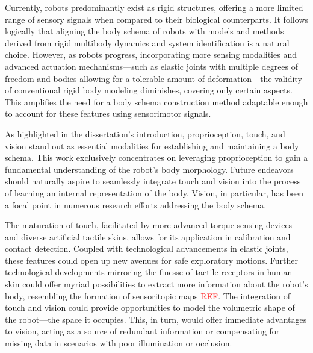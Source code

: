 \documentclass[12pt, a4paper]{article}
\newcommand{\redtext}[1]{\textcolor{red}{#1}}
\begin{document}
Currently, robots predominantly exist as rigid structures, offering a more limited range of sensory signals when compared to their biological counterparts. It follows logically that aligning the body schema of robots with models and methods derived from rigid multibody dynamics and system identification is a natural choice. However, as robots progress, incorporating more sensing modalities and advanced actuation mechanisms—such as elastic joints with multiple degrees of freedom and bodies allowing for a tolerable amount of deformation—the validity of conventional rigid body modeling diminishes, covering only certain aspects. This amplifies the need for a body schema construction method adaptable enough to account for these features using sensorimotor signals.

As highlighted in the dissertation's introduction, proprioception, touch, and vision stand out as essential modalities for establishing and maintaining a body schema. This work exclusively concentrates on leveraging proprioception to gain a fundamental understanding of the robot's body morphology. Future endeavors should naturally aspire to seamlessly integrate touch and vision into the process of learning an internal representation of the body. Vision, in particular, has been a focal point in numerous research efforts addressing the body schema.

The maturation of touch, facilitated by more advanced torque sensing devices and diverse artificial tactile skins, allows for its application in calibration and contact detection. Coupled with technological advancements in elastic joints, these features could open up new avenues for safe exploratory motions. Further technological developments mirroring the finesse of tactile receptors in human skin could offer myriad possibilities to extract more information about the robot's body, resembling the formation of sensoritopic maps \redtext{REF}. The integration of touch and vision could provide opportunities to model the volumetric shape of the robot—the space it occupies. This, in turn, would offer immediate advantages to vision, acting as a source of redundant information or compensating for missing data in scenarios with poor illumination or occlusion.





\end{document}
